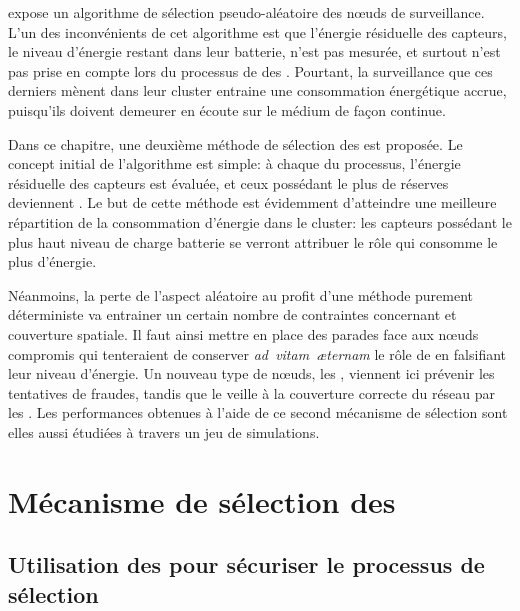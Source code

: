 
 expose un algorithme de sélection pseudo-aléatoire des nœuds de surveillance.
L'un des inconvénients de cet algorithme est que l'énergie résiduelle des capteurs, \cad le niveau d'énergie restant dans leur batterie, n'est pas mesurée, et surtout n'est pas prise en compte lors du processus de  des \cns.
Pourtant, la surveillance que ces derniers mènent dans leur cluster entraine une consommation énergétique accrue, puisqu'ils doivent demeurer en écoute sur le médium de façon continue.

Dans ce chapitre, une deuxième méthode de sélection des \cns est proposée.
Le concept initial de l'algorithme est simple: à chaque  du processus, l'énergie résiduelle des capteurs est évaluée, et ceux possédant le plus de réserves deviennent \cns.
Le but de cette méthode est évidemment d'atteindre une meilleure répartition de la consommation d'énergie dans le cluster: les capteurs possédant le plus haut niveau de charge batterie se verront attribuer le rôle qui consomme le plus d'énergie.

Néanmoins, la perte de l'aspect aléatoire au profit d'une méthode purement déterministe va entrainer un certain nombre de contraintes concernant \secu et couverture spatiale.
Il faut ainsi mettre en place des parades face aux nœuds compromis qui tenteraient de conserver \textit{ad~vitam~æternam} le rôle de \cn en falsifiant leur niveau d'énergie.
Un nouveau type de nœuds, les \vns, viennent ici prévenir les tentatives de fraudes, tandis que le \ch veille à la couverture correcte du réseau par les \cns.
Les performances obtenues à l'aide de ce second mécanisme de sélection sont elles aussi étudiées à travers un jeu de simulations.

\section{Mécanisme de sélection des \cns}\label{se:sec:proposal}

    \subsection{Utilisation des \vns pour sécuriser le processus de sélection}\label{se:subsubsec:elec1}

